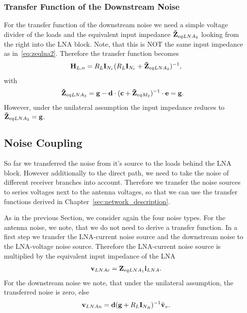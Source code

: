 \subsubsection{Transfer Function of the Downstream Noise}
\label{sec:down_noise_transf}
For the transfer function of the downstream noise we need a simple voltage divider of the loads and the equivalent input impedance $\mathbf{\tilde{Z}}_{eqLNA_2}$ looking from the right into the LNA block.
Note, that this is NOT the same input impedance as in~\eqref{eq:zeqlna2}.
Therefore the transfer function becomes
\begin{equation}
\mathbf{H}_{L,n} = R_L\mathbf{I}_{N_r}(R_L\mathbf{I}_{N_r} + \mathbf{\tilde{Z}}_{eqLNA_2})^{-1},
\end{equation}
with 
\begin{align}
\label{eq:zeqlna2_down}
\mathbf{\tilde{Z}}_{eqLNA_2} &= \mathbf{g} - \mathbf{d}\cdot(\mathbf{c} + \mathbf{\tilde{Z}}_{eqM_2})^{-1}\cdot\mathbf{e} = \mathbf{g}.
\end{align}
However, under the unilateral assumption the input impedance reduces to $\mathbf{\tilde{Z}}_{eqLNA_2} = \mathbf{g}$.


\subsection{Noise Coupling}
\label{sec:noise_coupling}

So far we transferred the noise from it's source to the loads behind the LNA block.
However additionally to the direct path, we need to take the noise of different receiver branches into account.
Therefore we transfer the noise sources to series voltages next to the antenna voltages, so that we can use the transfer functions derived in Chapter~\ref{sec:network_description}.

As in the previous Section, we consider again the four noise types.
For the antenna noise, we note, that we do not need to derive a transfer function.
In a first step we transfer the LNA-current noise source and the downstream noise to the LNA-voltage noise source.
Therefore the LNA-current noise source is multiplied by the equivalent input impedance of the LNA
\begin{align}
\mathbf{v}_{LNAc} = \mathbf{Z}_{eqLNA_1} \mathbf{i}_{LNA}.
\end{align}
For the downstream noise we note, that under the unilateral assumption, the transferred noise is zero, else
\begin{align}
\mathbf{v}_{LNAn} = \mathbf{d}(\mathbf{g}+R_L\mathbf{I}_{N_R})^{-1} \tilde{\mathbf{v}}_{v}.
\end{align}

